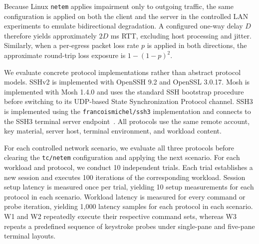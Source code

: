 \begin{table}[t]
\centering
\caption{Network parameters}
\label{tab:network-scenarios}
\end{table}

Because Linux \texttt{netem} applies impairment only to outgoing traffic, the same configuration is applied on both the client and the server in the controlled LAN experiments to emulate bidirectional degradation. A configured one-way delay $D$ therefore yields approximately $2D$ ms RTT, excluding host processing and jitter. Similarly, when a per-egress packet loss rate $p$ is applied in both directions, the approximate round-trip loss exposure is $1-(1-p)^2$.

We evaluate concrete protocol implementations rather than abstract protocol models. SSHv2 is implemented with OpenSSH 9.2 and OpenSSL 3.0.17. Mosh is implemented with Mosh 1.4.0 and uses the standard SSH bootstrap procedure before switching to its UDP-based State Synchronization Protocol channel. SSH3 is implemented using the \texttt{francoismichel/ssh3} implementation and connects to the SSH3 terminal server endpoint~\cite{michel2023}. All protocols use the same remote account, key material, server host, terminal environment, and workload content.

For each controlled network scenario, we evaluate all three protocols
before clearing the \texttt{tc/netem} configuration and applying the next scenario. For each workload and protocol, we conduct 10 independent trials. Each trial establishes a new session and executes 100 iterations of the corresponding workload. Session setup latency is measured once per trial, yielding 10 setup measurements for each protocol in each scenario. Workload latency is measured for every command or probe iteration, yielding 1,000 latency samples for each protocol in each scenario. W1 and W2 repeatedly execute their respective command sets, whereas W3 repeats a predefined sequence of keystroke probes under single-pane and five-pane terminal
layouts.


